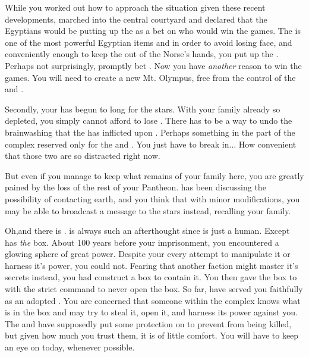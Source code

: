 \documentclass[char]{guardians}
\begin{document}
While you worked out how to approach the situation given these recent developments, \cOsiris{} marched into the central courtyard and declared that the Egyptians would be putting up the \iNecro{\MYname} as a bet on who would win the games. The \iNecro{\MYname} is one of the most powerful Egyptian items and in order to avoid losing face, and conveniently enough to keep the \iSandals{\MYname} out of the Norse's hands, you put up the \iSandals{\MYname}. Perhaps not surprisingly, \cOdin{} promptly bet \iHammer{\MYname}. Now you have \emph{another} reason to win the games. You will need \iHammer{\MYname} to create a new Mt. Olympus, free from the control of the \cCaretaker{} and \cWarden{}.

Secondly, your \cAthena{\offspring} \cAthena{} has begun to long for the stars. With your family already so depleted, you simply cannot afford to lose \cAthena{\them}. There has to be a way to undo the brainwashing that the \cCaretaker{} has inflicted upon \cAthena{}. Perhaps something in the part of the complex reserved only for the \cCaretaker{} and \cWarden{}. You just have to break in... How convenient that those two are so distracted right now.

But even if you manage to keep what remains of your family here, you are greatly pained by the loss of the rest of your Pantheon.  \cHephaestus{} has been discussing the possibility of contacting earth, and you think that with minor modifications, you may be able to broadcast a message to the stars instead, recalling your family.

Oh,and there is \cPandora{}. \cPandora{\They} is always such an afterthought since \cPandora{\they} is just a human. Except \cPandora{} has \emph{the} box. About 100 years before your imprisonment, you encountered a glowing sphere of great power. Despite your every attempt to manipulate it or harness it's power, you could not. Fearing that another faction might master it's secrets instead, you had \cHephaestus{} construct a box to contain it. You then gave the box to \cPandora{} with the strict command to never open the box. So far, \cPandora{\they} have served you faithfully as an adopted \cPandora{\offspring}. You are concerned that someone within the complex knows what is in the box and may try to steal it, open it, and harness its power against you. The \cCaretaker{} and \cWarden{} have supposedly put some protection on \cPandora{} to prevent \cPandora{\them} from being killed, but given how much you trust them, it is of little comfort. You will have to keep an eye on \cPandora{} today, whenever possible.
\end{document}
